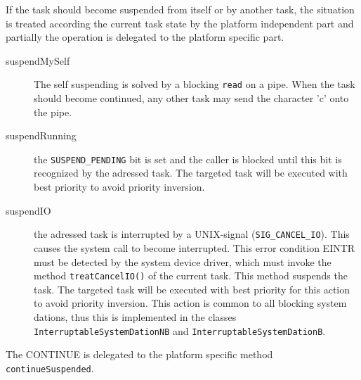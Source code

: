 If the task should become suspended from itself or by another task, 
the situation is treated according the current task state by the
platform independent part and partially the operation is delegated 
to the platform specific part.

\begin{description}

\item[suspendMySelf] 
The self suspending is solved by a blocking \verb|read| on a pipe.
When the task should become continued,
 any other task may send the character 'c' onto the pipe.

\item[suspendRunning] the \verb|SUSPEND_PENDING| bit is set and the caller
   is blocked until this bit is recognized by the adressed task.
   The targeted task will be executed with best priority to avoid
   priority inversion.

\item[suspendIO] the adressed task is interrupted by a 
   UNIX-signal (\verb|SIG_CANCEL_IO|). This causes the system
   call to become interrupted. This error condition EINTR must 
   be detected by the system device driver, which must invoke the method
   \verb|treatCancelIO()| of the current task. This method suspends 
   the task.
   The targeted task will be executed with best priority for this 
   action to avoid priority inversion.
   This action is common to all blocking system dations, thus this is 
   implemented in the classes \verb|InterruptableSystemDationNB| and
   \verb|InterruptableSystemDationB|.
\end{description}

The CONTINUE is delegated to the platform specific method
\verb|continueSuspended|.

